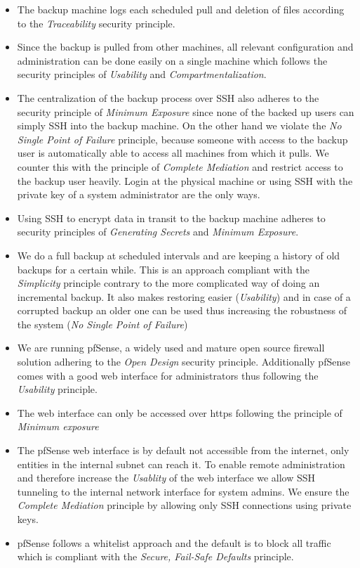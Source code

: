 \documentclass[english]{article}
\begin{document}
\begin{itemize}
    \item The backup machine logs each scheduled pull and deletion of files according to the \emph{Traceability} security principle.
    \item Since the backup is pulled from other machines, all relevant configuration and administration can  be done easily on a single machine which follows the security principles of \emph{Usability} and \emph{Compartmentalization}.
    \item The centralization of the backup process over SSH also adheres to the security principle of \emph{Minimum Exposure} since none of the backed up users can simply SSH into the backup machine. On the other hand we violate the \emph{No Single Point of Failure} principle, because someone with access to the backup user is automatically able to access all machines from which it pulls. We counter this with the principle of \emph{Complete Mediation} and restrict access to the backup user heavily. Login at the physical machine or using SSH with the private key of a system administrator are the only ways.
    \item Using SSH to encrypt data in transit to the backup machine adheres to security principles of \emph{Generating Secrets} and \emph{Minimum Exposure}.
    \item We do a full backup at scheduled intervals and are keeping a history of old backups for a certain while. This is an approach compliant with the \emph{Simplicity} principle contrary to the more complicated way of doing an incremental backup. It also makes restoring easier (\emph{Usability}) and in case of a corrupted backup an older one can be used thus increasing the robustness of the system (\emph{No Single Point of Failure})
\end{itemize}


\begin{itemize}
    \item We are running pfSense, a widely used and mature open source firewall solution adhering to the \emph{Open Design} security principle. Additionally pfSense comes with a good web interface for administrators thus following the \emph{Usability} principle.
    \item The web interface can only be accessed over https following the principle of \emph{Minimum exposure}
    \item The pfSense web interface is by default not accessible from the internet, only entities in the internal subnet can reach it. To enable remote administration and therefore increase the \emph{Usablity} of the web interface we allow SSH tunneling to the internal network interface for system admins. We ensure the \emph{Complete Mediation} principle by allowing only SSH connections using private keys.
    \item pfSense follows a whitelist approach and the default is to block all traffic which is compliant with the \emph{Secure, Fail-Safe Defaults} principle.
\end{itemize}
\end{document}
